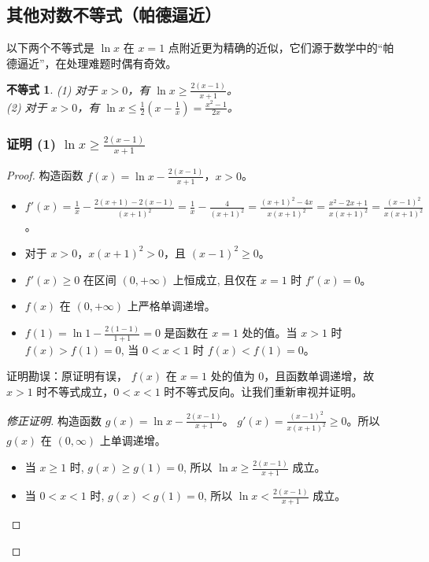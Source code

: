 \documentclass[a4paper,12pt]{ctexart}
\theoremstyle{mytheoremstyle}
\newtheorem{theorem}{不等式}
\begin{document}
\newpage
\subsection{\textcolor{MyPurple}{其他对数不等式（帕德逼近）}}
以下两个不等式是 $\ln x$ 在 $x=1$ 点附近更为精确的近似，它们源于数学中的“帕德逼近”，在处理难题时偶有奇效。

\begin{theorem}
(1) 对于 $x > 0$，有 $\ln x \ge \frac{2(x-1)}{x+1}$。\\
(2) 对于 $x > 0$，有 $\ln x \le \frac{1}{2}(x-\frac{1}{x}) = \frac{x^2-1}{2x}$。
\end{theorem}

\subsubsection*{\textcolor{MyGreen}{证明 (1) $\ln x \ge \frac{2(x-1)}{x+1}$}}
\begin{proof}
构造函数 $f(x) = \ln x - \frac{2(x-1)}{x+1}$，$x > 0$。
\begin{itemize}
    \item[∵] $f'(x) = \frac{1}{x} - \frac{2(x+1)-2(x-1)}{(x+1)^2} = \frac{1}{x} - \frac{4}{(x+1)^2} = \frac{(x+1)^2-4x}{x(x+1)^2} = \frac{x^2-2x+1}{x(x+1)^2} = \frac{(x-1)^2}{x(x+1)^2}$。
    \item[∵] 对于 $x > 0$，$x(x+1)^2 > 0$，且 $(x-1)^2 \ge 0$。
    \item[∴] $f'(x) \ge 0$ 在区间 $(0, +\infty)$ 上恒成立, 且仅在 $x=1$ 时 $f'(x)=0$。
    \item[∴] $f(x)$ 在 $(0, +\infty)$ 上严格单调递增。
    \item[∴] $f(1) = \ln 1 - \frac{2(1-1)}{1+1} = 0$ 是函数在 $x=1$ 处的值。当 $x>1$ 时 $f(x)>f(1)=0$, 当 $0<x<1$ 时 $f(x)<f(1)=0$。
\end{itemize}
证明勘误：原证明有误， $f(x)$ 在 $x=1$ 处的值为 0，且函数单调递增，故 $x>1$ 时不等式成立，$0<x<1$ 时不等式反向。让我们重新审视并证明。
\begin{proof}[修正证明]
构造函数 $g(x)=\ln x-\frac{2(x-1)}{x+1}$。 $g'(x)=\frac{(x-1)^2}{x(x+1)^2}\ge 0$。所以 $g(x)$ 在 $(0,\infty)$ 上单调递增。
\begin{itemize}
    \item 当 $x \ge 1$ 时, $g(x) \ge g(1) = 0$, 所以 $\ln x \ge \frac{2(x-1)}{x+1}$ 成立。
    \item 当 $0< x < 1$ 时, $g(x) < g(1) = 0$, 所以 $\ln x < \frac{2(x-1)}{x+1}$ 成立。
\end{itemize}
\end{proof}
\end{proof}
\end{document}
